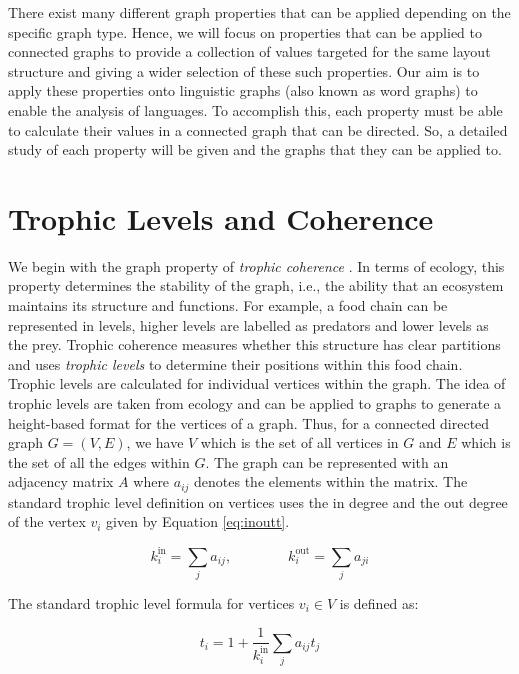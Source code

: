 There exist many different graph properties that can be applied depending on the specific graph type. Hence, we will focus on properties that can be applied to connected graphs to provide a collection of values targeted for the same layout structure and giving a wider selection of these such properties. Our aim is to apply these properties onto linguistic graphs (also known as word graphs) to enable the analysis of languages. To accomplish this, each property must be able to calculate their values in a connected graph that can be directed. So, a detailed study of each property will be given and the graphs that they can be applied to. 

\section{Trophic Levels and Coherence}
We begin with the graph property of \emph{trophic coherence} \cite{johnson2014trophic}. In terms of ecology, this property determines the stability of the graph, i.e., the ability that an ecosystem maintains its structure and functions. For example, a food chain \cite{saigo2015trophic} can be represented in levels, higher levels are labelled as predators and lower levels as the prey. Trophic coherence measures whether this structure has clear partitions and uses \emph{trophic levels} to determine their positions within this food chain. Trophic levels are calculated for individual vertices within the graph. The idea of trophic levels are taken from ecology and can be applied to graphs to generate a height-based format for the vertices of a graph. Thus, for a connected directed graph $G =(V,E)$, we have $V$ which is the set of all vertices in $G$ and $E$ which is the set of all the edges within $G$. The graph can be represented with an adjacency matrix $A$ where $a_{ij}$ denotes the elements within the matrix. The standard trophic level definition on vertices uses the in degree and the out degree of the vertex $v_i$ given by Equation \ref{eq:inoutt}.

\begin{equation} \label{eq:inoutt}
k_i^{\text{in}} = \sum_ja_{ij} , \qquad \qquad k_i^{\text{out}} = \sum_ja_{ji} 
\end{equation}

The standard trophic level formula for vertices $v_i \in V$ is defined as:

\begin{equation}
t_i = 1 + \frac{1}{k_i^{\text{in}}}\sum_ja_{ij}t_j
\end{equation}

